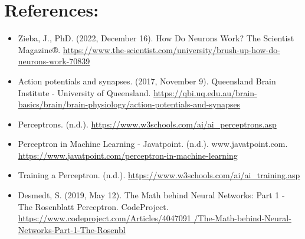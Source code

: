 \documentclass[12pt]{article}
\begin{document}
\section{References:}
\begin{itemize}
\item Zieba, J., PhD. (2022, December 16). How Do Neurons Work? The Scientist Magazine®.
  \url{https://www.the-scientist.com/university/brush-up-how-do-neurons-work-70839}
\item Action potentials and synapses. (2017, November 9). Queensland Brain Institute - University
  of Queensland.
  \url{https://qbi.uq.edu.au/brain-basics/brain/brain-physiology/action-potentials-and-synapses}
\item Perceptrons. (n.d.). \url{https://www.w3schools.com/ai/ai_perceptrons.asp}
\item Perceptron in Machine Learning - Javatpoint. (n.d.). www.javatpoint.com.
  \url{https://www.javatpoint.com/perceptron-in-machine-learning}
\item Training a Perceptron. (n.d.). \url{https://www.w3schools.com/ai/ai_training.asp}
\item Desmedt, S. (2019, May 12). The Math behind Neural Networks: Part 1 - The Rosenblatt Perceptron.
  CodeProject.
  \url{https://www.codeproject.com/Articles/4047091
    /The-Math-behind-Neural-Networks-Part-1-The-Rosenbl}
\end{itemize}
\end{document}
